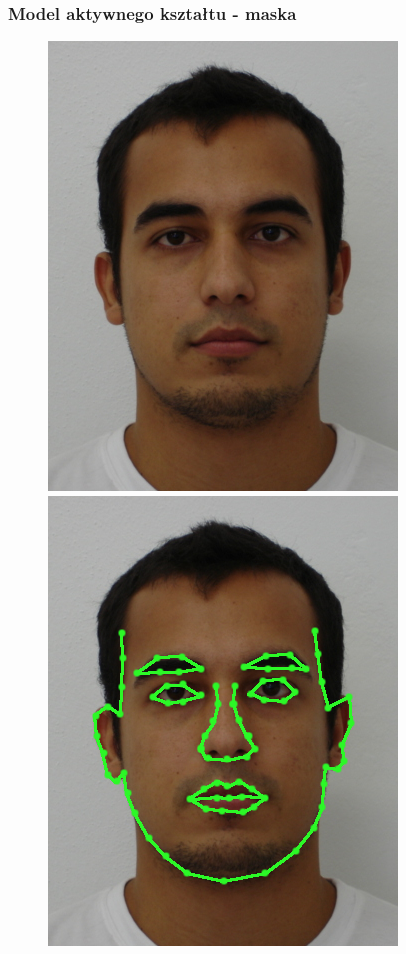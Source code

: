 \documentclass[xcolor=table]{beamer}
\begin{document}
\begin{frame}
  \frametitle{Model aktywnego kształtu - maska}
\begin{center}
  \begin{figure}
     {\includegraphics[scale=0.4]{aktywny2.png}}
     {\includegraphics[scale=0.4]{aktywny3.png}}

\end{figure}
\end{center}
\end{frame}
\end{document}
